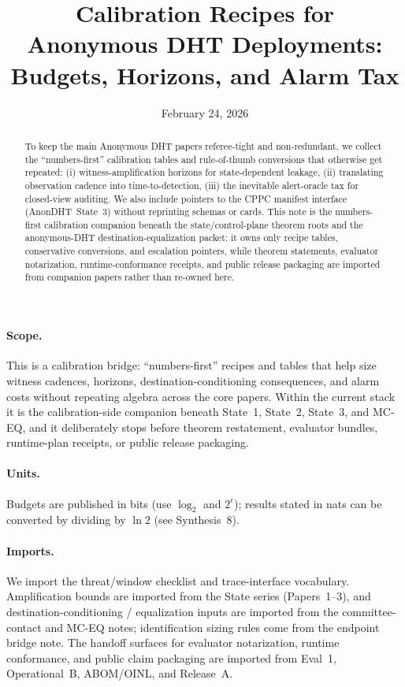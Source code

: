 \documentclass[11pt]{article}
\title{Calibration Recipes for Anonymous DHT Deployments:\\ Budgets, Horizons, and Alarm Tax}
\author{}
\date{February 24, 2026}
\begin{document}
\maketitle

\begin{abstract}
To keep the main Anonymous DHT papers referee-tight and non-redundant, we collect the ``numbers-first'' calibration tables and rule-of-thumb conversions that otherwise get repeated:
(i) witness-amplification horizons for state-dependent leakage,
(ii) translating observation cadence into time-to-detection,
(iii) the inevitable alert-oracle tax for closed-view auditing.
We also include pointers to the CPPC manifest interface (AnonDHT~State~3) without reprinting schemas or cards.\cite{state3}
This note is the numbers-first calibration companion beneath the state/control-plane theorem roots and the anonymous-DHT destination-equalization packet: it owns only recipe tables, conservative conversions, and escalation pointers, while theorem statements, evaluator notarization, runtime-conformance receipts, and public release packaging are imported from companion papers rather than re-owned here.\cite{state1,state2,state3,series:mceq,series:eval1,series:opB,series:abom,series:releaseproperty}
\end{abstract}
\paragraph{Scope.}
This is a calibration bridge: ``numbers-first'' recipes and tables that help size witness cadences, horizons, destination-conditioning consequences, and alarm costs without repeating algebra across the core papers. Within the current stack it is the calibration-side companion beneath State~1, State~2, State~3, and MC-EQ, and it deliberately stops before theorem restatement, evaluator bundles, runtime-plan receipts, or public release packaging.\cite{state1,state2,state3,series:mceq,series:eval1,series:opB,series:abom,series:releaseproperty}

\paragraph{Units.} Budgets are published in bits (use $\log_2$ and $2^{\epsilon}$); results stated in nats can be converted by dividing by $\ln 2$ (see Synthesis~8).\cite{series:notation}

\paragraph{Imports.}
We import the threat/window checklist and trace-interface vocabulary.\cite{series:threatwindows,series:traceifaces}
Amplification bounds are imported from the State series (Papers~1--3), and destination-conditioning / equalization inputs are imported from the committee-contact and MC-EQ notes; identification sizing rules come from the endpoint bridge note.\cite{state1,state2,state3,series:mceq,synth5}
The handoff surfaces for evaluator notarization, runtime conformance, and public claim packaging are imported from Eval~1, Operational~B, ABOM/OINL, and Release~A.\cite{series:eval1,series:opB,series:abom,series:releaseproperty}
\end{document}
